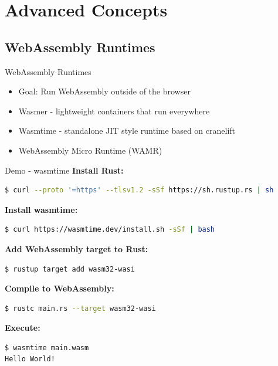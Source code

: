 \documentclass{beamer}
\begin{document}
\section{Advanced Concepts}

\subsection{WebAssembly Runtimes}

\begin{frame}{WebAssembly Runtimes}
    \begin{itemize}
        \item Goal: Run WebAssembly outside of the browser
        \item Wasmer - lightweight containers that run everywhere
        \item Wasmtime - standalone JIT style runtime based on cranelift
        \item WebAssembly Micro Runtime (WAMR)
    \end{itemize}
\end{frame}

\begin{frame}[fragile]{Demo - wasmtime}
    \textbf{Install Rust:}
    \begin{lstlisting}[language=bash,basicstyle=\scriptsize]
$ curl --proto '=https' --tlsv1.2 -sSf https://sh.rustup.rs | sh
    \end{lstlisting}

    \textbf{Install wasmtime:}
    \begin{lstlisting}[language=bash,basicstyle=\scriptsize]
$ curl https://wasmtime.dev/install.sh -sSf | bash
    \end{lstlisting}

    \textbf{Add WebAssembly target to Rust:}
    \begin{lstlisting}[language=bash,basicstyle=\scriptsize]
$ rustup target add wasm32-wasi
    \end{lstlisting}

    \textbf{Compile to WebAssembly:}
    \begin{lstlisting}[language=bash,basicstyle=\scriptsize]
$ rustc main.rs --target wasm32-wasi
    \end{lstlisting}

    \textbf{Execute:}
    \begin{lstlisting}[language=bash,basicstyle=\scriptsize]
$ wasmtime main.wasm
Hello World!
    \end{lstlisting}
\end{frame}
\end{document}
